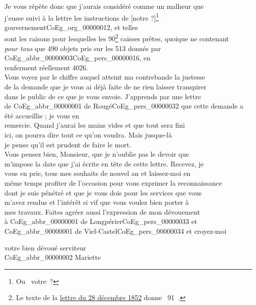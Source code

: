 \documentclass{book}
\begin{document}
Je vous répète donc que j’aurais considéré comme un malheur que\\
j’eusse suivi à la lettre les instructions de [notre ?]\footnote{Ou \og ~votre~\fg ?} gouvernement\gls{CoEg_org_00000012}, et telles\\
sont les raisons pour lesquelles les 90\footnote{Le texte de la \hyperref[CoEg_Mariette_1852-12-28]{lettre du 28 décembre 1852} donne \og ~91~\fg.} caisses prêtes, quoique ne contenant\\
\textit{pour tous} que 490 objets pris sur les 513 donnés par \gls{CoEg_abbr_00000003}\gls{CoEg_pers_00000016}, en\\
renferment réellement 4026.\\
\indent Vous voyez par le chiffre auquel atteint ma contrebande la justesse\\
de la demande que je vous ai déjà faite de ne rien laisser transpirer\\
dans le public de ce que je vous envoie. J’apprends par une lettre\\
de \gls{CoEg_abbr_00000001} de Rougé\gls{CoEg_pers_00000032} que cette demande a été accueillie ; je vous en\\
remercie. Quand j’aurai les mains vides et que tout sera fini\\
ici, on pourra dire tout ce qu’on voudra. Mais jusque-là\\
je pense qu’il est prudent de faire le mort.\\
\indent Vous pensez bien, Monsieur, que je n’oublie pas le devoir que\\
m’impose la date que j’ai écrite en tête de cette lettre. Recevez, je\\
vous en prie, tous mes souhaits de nouvel an et laissez-moi en\\
même temps profiter de l’occasion pour vous exprimer la reconnaissance\\
dont je suis pénétré et que je vous dois pour les services que vous\\
m’avez rendus et l’intérêt si vif que vous voulez bien porter à\\
mes travaux. Faites agréer aussi l’expression de mon dévouement\\
à \gls{CoEg_abbr_00000001} de Longpérier\gls{CoEg_pers_00000033} et \gls{CoEg_abbr_00000001} de Viel-Castel\gls{CoEg_pers_00000034} et croyez-moi\\
\begin{center}\hspace{5cm}votre bien dévoué serviteur\\
\hspace{5cm}\gls{CoEg_abbr_00000002} Mariette\end{center}
\end{document}
